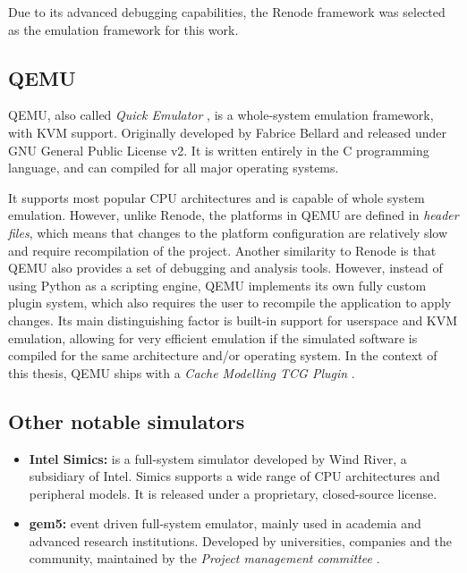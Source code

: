 \noindent Due to its advanced debugging capabilities, the Renode framework was selected as the emulation framework for this work.

\subsection{QEMU}

QEMU, also called \textit{Quick Emulator} \cite{qemuoriginal}, is a whole-system emulation framework, with KVM support. Originally developed by Fabrice Bellard \cite{qemufabrice} and released
under GNU General Public License v2. It is written entirely in the C programming language, and can compiled for all major operating systems.

It supports most popular CPU architectures and is capable of whole system emulation. However, unlike Renode, the platforms in QEMU are defined in \textit{header files}, which means
that changes to the platform configuration are relatively slow and require recompilation of the project. Another similarity to Renode is that QEMU also provides a set of debugging
and analysis tools. However, instead of using Python as a scripting engine, QEMU implements its own fully custom plugin system, which also requires the user to recompile the
application to apply changes. Its main distinguishing factor is built-in support for userspace and KVM emulation, allowing for very efficient emulation if the simulated software is
compiled for the same architecture and/or operating system. In the context of this thesis, QEMU ships with a \textit{Cache Modelling TCG Plugin} \cite{tcgcachemodelling}.

\subsection{Other notable simulators}

\begin{itemize} %
	\item \textbf{Intel Simics:} is a full-system simulator developed by Wind River, a subsidiary of Intel. Simics supports a wide range of CPU architectures and peripheral models.
		It is released under a proprietary, closed-source license.
	\item \textbf{gem5:} event driven full-system emulator, mainly used in academia and advanced research institutions. Developed by universities, companies and the community, maintained by the
		\textit{Project management committee} \cite{gem5governance}. %
\end{itemize}

